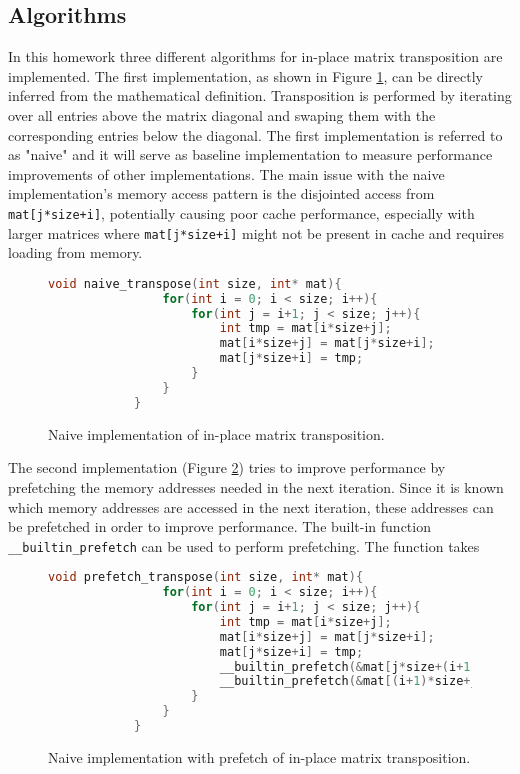 \documentclass{scrartcl}
\begin{document}
    \subsection{Algorithms}
    In this homework three different algorithms for in-place matrix transposition are implemented. The first implementation, as shown in Figure \ref{fig:naive_implementation}, can be directly inferred from the mathematical definition. Transposition is performed by iterating over all entries above the matrix diagonal and swaping them with the corresponding entries below the diagonal. The first implementation is referred to as "naive" and it will serve as baseline implementation to measure performance improvements of other implementations. 
    The main issue with the naive implementation's memory access pattern is the disjointed access from \lstinline{mat[j*size+i]}, potentially causing poor cache performance, especially with larger matrices where \lstinline{mat[j*size+i]} might not be present in cache and requires loading from memory.
    
    \begin{figure}
        \begin{lstlisting}[language=C]
            void naive_transpose(int size, int* mat){
                for(int i = 0; i < size; i++){
                    for(int j = i+1; j < size; j++){
                        int tmp = mat[i*size+j];
                        mat[i*size+j] = mat[j*size+i];
                        mat[j*size+i] = tmp;
                    }
                }
            }
        \end{lstlisting}
        \caption{Naive implementation of in-place matrix transposition.}
        \label{fig:naive_implementation}        
    \end{figure}

    The second implementation (Figure \ref{fig:prefetch_implementation}) tries to improve performance by prefetching the memory addresses needed in the next iteration. Since it is known which memory addresses are accessed in the next iteration, these addresses can be prefetched in order to improve performance. The built-in function \lstinline{__builtin_prefetch} can be used to perform prefetching. The function takes 
    
    \begin{figure}
        \begin{lstlisting}[language=C]
            void prefetch_transpose(int size, int* mat){
                for(int i = 0; i < size; i++){
                    for(int j = i+1; j < size; j++){
                        int tmp = mat[i*size+j];
                        mat[i*size+j] = mat[j*size+i];
                        mat[j*size+i] = tmp;
                        __builtin_prefetch(&mat[j*size+(i+1)], 1, 0);
                        __builtin_prefetch(&mat[(i+1)*size+j], 1, 0);
                    }
                }
            }
        \end{lstlisting}
        \caption{Naive implementation with prefetch of in-place matrix transposition.}
        \label{fig:prefetch_implementation}        
    \end{figure}
\end{document}
